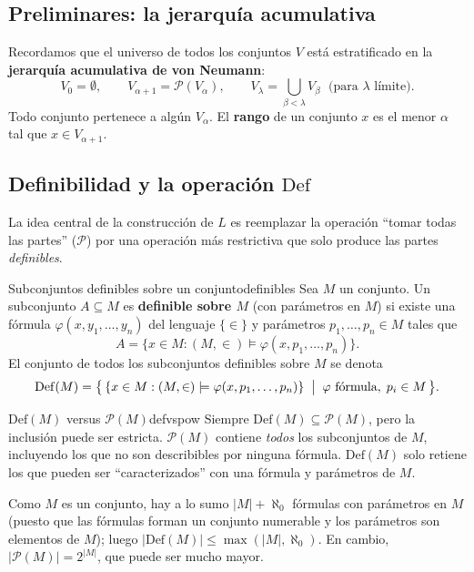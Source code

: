 \subsection{Preliminares: la jerarquía acumulativa}

Recordamos que el universo de todos los conjuntos $V$ está estratificado en la \textbf{jerarquía acumulativa de von Neumann}:
\[
  V_0 = \emptyset, \qquad
  V_{\alpha+1} = \mathcal{P}(V_\alpha), \qquad
  V_\lambda = \bigcup_{\beta < \lambda} V_\beta \;\text{ (para } \lambda \text{ límite)}.
\]
Todo conjunto pertenece a algún $V_\alpha$. El \textbf{rango} de un conjunto $x$ es el menor $\alpha$ tal que $x \in V_{\alpha+1}$.

\subsection{Definibilidad y la operación \texorpdfstring{$\mathrm{Def}$}{Def}}

La idea central de la construcción de $L$ es reemplazar la operación ``tomar todas las partes'' ($\mathcal{P}$) por una operación más restrictiva que solo produce las partes \emph{definibles}.

\begin{definicion}{Subconjuntos definibles sobre un conjunto}{definibles}
Sea $M$ un conjunto. Un subconjunto $A \subseteq M$ es \textbf{definible sobre $M$} (con parámetros en $M$) si existe una fórmula $\varphi(x, y_1, \ldots, y_n)$ del lenguaje $\{\in\}$ y parámetros $p_1, \ldots, p_n \in M$ tales que
\[
  A = \{x \in M : (M, \in) \models \varphi(x, p_1, \ldots, p_n)\}.
\]
El conjunto de todos los subconjuntos definibles sobre $M$ se denota
\[
  \mathrm{Def}(M) = \bigl\{\, \{x \in M : (M,\in) \models \varphi(x, p_1, \ldots, p_n)\} \;\bigm|\; \varphi \text{ fórmula},\; p_i \in M \,\bigr\}.
\]
\end{definicion}

\begin{observacion}{$\mathrm{Def}(M)$ versus $\mathcal{P}(M)$}{defvspow}
Siempre $\mathrm{Def}(M) \subseteq \mathcal{P}(M)$, pero la inclusión puede ser estricta. $\mathcal{P}(M)$ contiene \emph{todos} los subconjuntos de $M$, incluyendo los que no son describibles por ninguna fórmula. $\mathrm{Def}(M)$ solo retiene los que pueden ser ``caracterizados'' con una fórmula y parámetros de $M$.

Como $M$ es un conjunto, hay a lo sumo $|M| + \aleph_0$ fórmulas con parámetros en $M$ (puesto que las fórmulas forman un conjunto numerable y los parámetros son elementos de $M$); luego $|\mathrm{Def}(M)| \leq \max(|M|, \aleph_0)$. En cambio, $|\mathcal{P}(M)| = 2^{|M|}$, que puede ser mucho mayor.
\end{observacion}

